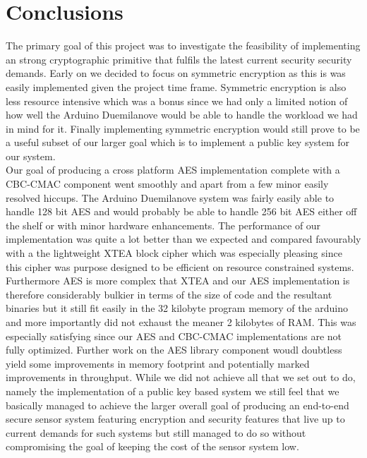 \section{Conclusions}

The primary goal of this project was to investigate the feasibility of implementing an strong cryptographic primitive that fulfils the latest current security security demands. Early on we decided to focus on symmetric encryption as this is was easily implemented given the project time frame. Symmetric encryption is also less resource intensive which was a bonus since we had only a limited notion of how well the Arduino Duemilanove would be able to handle the workload we had in mind for it. Finally implementing symmetric encryption would still prove to be a useful subset of our larger goal which is to implement a public key system for our system.\\

Our goal of producing a cross platform AES implementation complete with a CBC-CMAC component went smoothly and apart from a few minor easily resolved hiccups. The Arduino Duemilanove system was fairly easily able to handle 128 bit AES and would probably be able to handle 256 bit AES either off the shelf or with minor hardware enhancements. The performance of our implementation was quite a lot better than we expected and compared favourably with a the lightweight XTEA block cipher which was especially pleasing since this cipher was purpose designed to be efficient on resource constrained systems. Furthermore AES is more complex that XTEA and our AES implementation is therefore considerably bulkier in terms of the size of code and the resultant binaries but it still fit easily in the 32 kilobyte program memory of the arduino and more importantly did not exhaust the meaner 2 kilobytes of RAM. This was especially satisfying since our AES and CBC-CMAC implementations are not fully optimized. Further work on the AES library component woudl doubtless yield some improvements in memory footprint and potentially marked improvements in throughput. While we did not achieve all that we set out to do, namely the implementation of a public key based system we still feel that we basically managed to achieve the larger overall goal of producing an end-to-end secure sensor system featuring encryption and security features that live up to current demands for such systems but still managed to do so without compromising the goal of keeping the cost of the sensor system low.


\hspace*{20mm}




